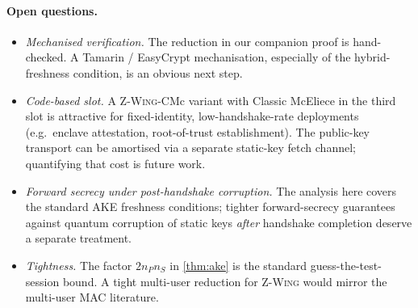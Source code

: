\documentclass[11pt,a4paper]{article}
\theoremstyle{definition}
\theoremstyle{remark}
\newcommand{\zwing}{\textsc{Z-Wing}}
\begin{document}
\paragraph{Open questions.}
\begin{itemize}
\item \emph{Mechanised verification.} The reduction in our companion proof is
hand-checked. A Tamarin / EasyCrypt mechanisation, especially of the
hybrid-freshness condition, is an obvious next step.
\item \emph{Code-based slot.} A \zwing{}-CMc variant with Classic McEliece
in the third slot is attractive for fixed-identity, low-handshake-rate
deployments (e.g.\ enclave attestation, root-of-trust establishment). The
public-key transport can be amortised via a separate static-key fetch
channel; quantifying that cost is future work.
\item \emph{Forward secrecy under post-handshake corruption.} The analysis
here covers the standard AKE freshness conditions; tighter forward-secrecy
guarantees against quantum corruption of static keys
\emph{after} handshake completion deserve a separate treatment.
\item \emph{Tightness.} The factor $2 n_P n_S$ in
\cref{thm:ake} is the standard guess-the-test-session bound. A tight
multi-user reduction for \zwing{} would mirror the multi-user MAC literature.
\end{itemize}

\printbibliography
\end{document}
